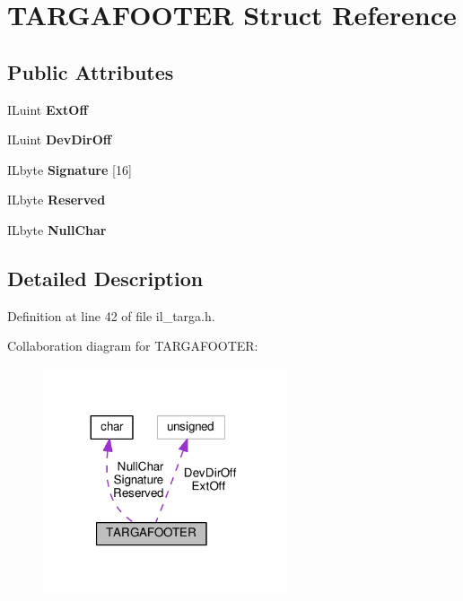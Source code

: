 \hypertarget{structTARGAFOOTER}{}\section{T\+A\+R\+G\+A\+F\+O\+O\+T\+ER Struct Reference}
\label{structTARGAFOOTER}
\subsection*{Public Attributes}
\begin{DoxyCompactItemize}
\item 
\mbox{\label{structTARGAFOOTER_aeb6c8c0aa38f84458b9f7d52d9c734dc}} 
I\+Luint {\bfseries Ext\+Off}
\item 
\mbox{\label{structTARGAFOOTER_a3d374b8079ada2473e793ebd6a8874de}} 
I\+Luint {\bfseries Dev\+Dir\+Off}
\item 
\mbox{\label{structTARGAFOOTER_a18334acfc857ba73c4e417969abd46ad}} 
I\+Lbyte {\bfseries Signature} \mbox{[}16\mbox{]}
\item 
\mbox{\label{structTARGAFOOTER_ac075c06ef754a6d330542f81698a30df}} 
I\+Lbyte {\bfseries Reserved}
\item 
\mbox{\label{structTARGAFOOTER_a8c9bf93672f995ff7b15d066adb89d72}} 
I\+Lbyte {\bfseries Null\+Char}
\end{DoxyCompactItemize}


\subsection{Detailed Description}


Definition at line 42 of file il\+\_\+targa.\+h.



Collaboration diagram for T\+A\+R\+G\+A\+F\+O\+O\+T\+ER\+:
\nopagebreak
\begin{figure}[H]
\begin{center}
\leavevmode
\includegraphics[width=203pt]{d6/da9/structTARGAFOOTER__coll__graph}
\end{center}
\end{figure}


